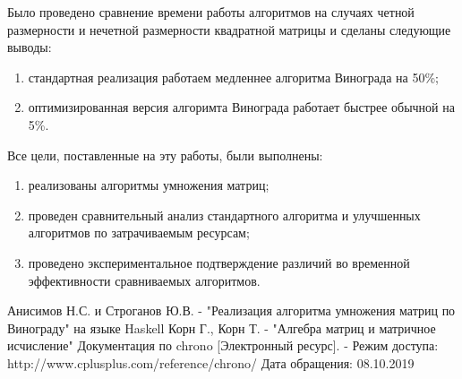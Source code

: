 \documentclass[a4paper,12pt]{article}
\begin{document}
Было проведено сравнение времени работы алгоритмов на случаях четной
размерности и нечетной размерности квадратной матрицы и сделаны
следующие выводы:

\begin{enumerate}
    \item стандартная реализация работаем медленнее алгоритма Винограда
        на 50\%;
    \item оптимизированная версия алгоримта Винограда работает быстрее
        обычной на 5\%.
\end{enumerate}

Все цели, поставленные на эту работы, были выполнены:

\begin{enumerate}
    \item реализованы алгоритмы умножения матриц;
    \item проведен сравнительный анализ стандартного алгоритма и улучшенных алгоритмов по
        затрачиваемым ресурсам;
    \item проведено экспериментальное подтверждение различий во временной эффективности
        сравниваемых алгоритмов.
\end{enumerate}

\newpage
{}

\begin{thebibliography}{}
     Анисимов Н.С. и Строганов Ю.В. - "Реализация алгоритма умножения матриц по Винограду"
на языке Haskell
     Корн Г., Корн Т. - "Алгебра матриц и матричное исчисление"
     Документация по chrono [Электронный ресурс]. -  Режим доступа: http://www.cplusplus.com/reference/chrono/ Дата обращения: 08.10.2019
\end{thebibliography}
\end{document}
